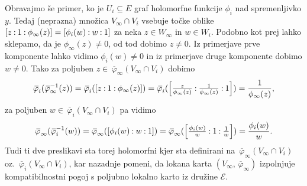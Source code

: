 \documentclass[mat1]{fmfdelo}
\newcommand{\inv}{^{-1}}
\newcommand{\pcoor}[1]{%
\begingroup\lccode`~=`: \lowercase{\endgroup
\edef~}{\mathbin{\mathchar\the\mathcode`:}\nobreak}%
\left[%
\begingroup
\mathcode`:=\string"8000
#1%
\endgroup
\right]%
}
\newcommand{\olsi}[1]{\,\overline{\!{#1}}} %
\DeclareMathOperator{\id}{id}
\theoremstyle{definition}
\begin{document}
Obravajmo še primer, ko je $U_i \subseteq E$ graf holomorfne funkcije $\phi_i$ nad spremenljivko $y$. Tedaj (neprazna) množica $V_\infty \cap V_i$ vsebuje točke oblike $\pcoor{z : 1 : \phi_\infty(z)} = \pcoor{\phi_i(w) : w : 1}$ za neka $z \in W_\infty$ in $w \in W_i$. Podobno kot prej lahko sklepamo, da je $\phi_\infty(z) \neq 0$, od tod dobimo $z \neq 0$. Iz primerjave prve komponente lahko vidimo $\phi_i(w) \neq 0$ in iz primerjave druge komponente dobimo $w \neq 0$. Tako za poljuben $z \in \olsi{\varphi}_\infty(V_\infty \cap V_i)$ dobimo
\[
    \olsi{\varphi}_i (\olsi{\varphi}_\infty\inv (z)) = 
    \olsi{\varphi}_i (\pcoor{z : 1 : \phi_\infty(z)}) = 
    \olsi{\varphi}_i (\pcoor{\tfrac{z}{\phi_\infty(z)} : \tfrac{1}{\phi_\infty(z)} : 1}) = 
    \frac{1}{\phi_\infty(z)},
\]
za poljuben $w \in \olsi{\varphi}_i(V_\infty \cap V_i)$ pa vidimo
\[
    \olsi{\varphi}_\infty (\olsi{\varphi}_i\inv(w)) =
    \olsi{\varphi}_\infty (\pcoor{\phi_i(w) : w : 1}) =
    \olsi{\varphi}_\infty (\pcoor{\tfrac{\phi_i(w)}{w} : 1 : \tfrac{1}{w}}) = 
    \frac{\phi_i(w)}{w}.
\]
Tudi ti dve preslikavi sta torej holomorfni kjer sta definirani na $\olsi{\varphi}_\infty(V_\infty \cap V_i)$ oz. $\olsi{\varphi}_i(V_\infty \cap V_i)$, kar nazadnje pomeni, da lokana karta $(V_\infty, \olsi{\varphi}_\infty)$ izpolnjuje kompatibilnostni pogoj s poljubno lokalno karto iz družine $\mathcal{E}$.


\end{document}
